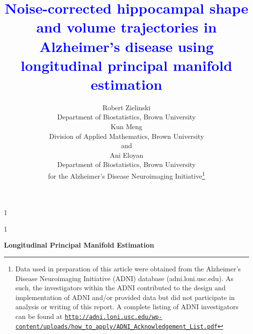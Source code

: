 \documentclass[12pt]{article}
\newcommand{\blind}{1}
\theoremstyle{definition}
\begin{document}
\def\spacingset#1{\renewcommand{\baselinestretch}%
{#1}\small\normalsize} \spacingset{1}

\newcommand{\revision}[1]{\textcolor{blue}{#1}}
\newcommand{\outdated}[1]{\sout{#1}}



\blind
{
  \title{\bf \revision{Noise-corrected hippocampal shape and volume trajectories in Alzheimer's disease using longitudinal principal manifold estimation}}
  \author{
    Robert Zielinski\hspace{.2cm}\\
    Department of Biostatistics, Brown University\\
    Kun Meng \\
    Division of Applied Mathematics, Brown University\\
    and \\
    Ani Eloyan \\
    Department of Biostatistics, Brown University\\
    for the Alzheimer's Disease Neuroimaging Initiative\thanks{Data used in preparation of this article were obtained from the Alzheimer's Disease Neuroimaging Initiative (ADNI) database (adni.loni.usc.edu). As such, the investigators within the ADNI contributed to the design and implementation of ADNI and/or provided data but did not participate in analysis or writing of this report. A complete listing of ADNI investigators can be found at \href{http://adni.loni.usc.edu/wp-content/uploads/how_to_apply/ADNI_Acknowledgement_List.pdf}{\texttt{http://adni.loni.usc.edu/wp-content/uploads/how\_to\_apply/ADNI\_Acknowledgement\_List.pdf}}}}
  \maketitle
} \fi

\blind
{
  \bigskip
  \bigskip
  \bigskip
  \begin{center}
    {\LARGE\bf Longitudinal Principal Manifold Estimation}
\end{center}
  \medskip
} \fi
\end{document}
